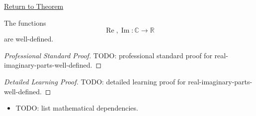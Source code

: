 \newpage
{}
\label{prf:real-imaginary-parts-well-defined}

\begin{remark*}[Return]
\hyperref[thm:real-imaginary-parts-well-defined]{Return to Theorem}
\end{remark*}

\begin{theorem*}
The functions
\[
\operatorname{Re},\operatorname{Im}:\mathbb{C}\to\mathbb{R}
\]
are well-defined.
\end{theorem*}

\begin{proof}[Professional Standard Proof]
\LRAProofBodyStart
TODO: professional standard proof for real-imaginary-parts-well-defined.
\end{proof}

\begin{proof}[Detailed Learning Proof]
\LRAProofBodyStart
TODO: detailed learning proof for real-imaginary-parts-well-defined.
\end{proof}

\begin{remark*}
\end{remark*}

\begin{dependencies}
\begin{itemize}
  \item TODO: list mathematical dependencies.
\end{itemize}
\end{dependencies}

\clearpage
